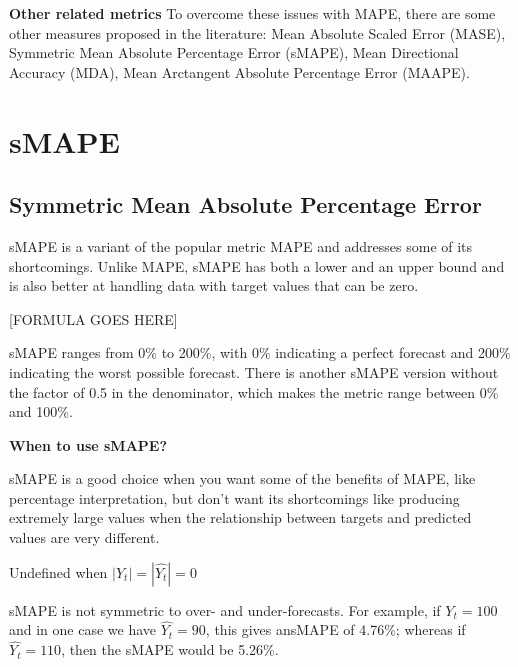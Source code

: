 \textbf{Other related metrics}
To overcome these issues with MAPE, there are some other measures proposed in the literature: Mean Absolute Scaled Error (MASE),
Symmetric Mean Absolute Percentage Error (sMAPE), Mean Directional Accuracy (MDA), Mean Arctangent Absolute Percentage Error (MAAPE).

\clearpage
\thispagestyle{regressionstyle}
\section{sMAPE}
\subsection{Symmetric Mean Absolute Percentage Error}

sMAPE is a variant of the popular metric MAPE and addresses some of its shortcomings. Unlike MAPE, sMAPE has both a lower and an upper bound and is also better
at handling data with target values that can be zero.

\begin{center}
    [FORMULA GOES HERE]
\end{center}

sMAPE ranges from 0\% to 200\%, with 0\% indicating a perfect forecast and 200\% indicating the worst possible forecast. There is another sMAPE version without the factor of 0.5 in the denominator, which makes the metric range between 0\% and 100\%.

\textbf{When to use sMAPE?}

sMAPE is a good choice when you want some of the benefits of MAPE, like percentage interpretation, but don't want its shortcomings like producing extremely large values when the relationship between
targets and predicted values are very different.

{
    \item Undefined when $|Y_{t}| = |\hat{Y_{t}}| = 0$
    \item sMAPE is not symmetric to over- and under-forecasts. For example, if $Y_{t} = 100$ and in one case we have $\hat{Y_{t}} = 90$, this gives ansMAPE of 4.76\%; whereas if $\hat{Y_{t}} = 110$, then the sMAPE would be 5.26\%.
}


\clearpage
\thispagestyle{regressionstyle}
